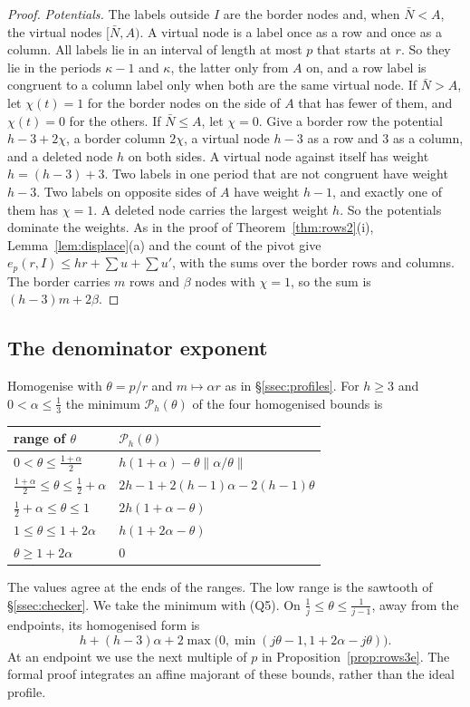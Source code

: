 \documentclass[11pt]{amsart}
\theoremstyle{definition}
\theoremstyle{remark}
\numberwithin{equation}{section}
\begin{document}
\begin{proof}
\emph{Potentials.} The labels outside $I$ are the border nodes and, when $\bar N<A$, the virtual nodes $[\bar N,A)$. A
virtual node is a label once as a row and once as a column. All labels lie in an interval of length at most $p$ that
starts at $r$. So they lie in the periods $\kappa-1$ and $\kappa$, the latter only from $A$ on, and a row label is
congruent to a column label only when both are the same virtual node. If $\bar N>A$, let $\chi(t)=1$ for the border
nodes on the side of $A$ that has fewer of them, and $\chi(t)=0$ for the others. If $\bar N\le A$, let $\chi=0$. Give a
border row the potential $h-3+2\chi$, a border column $2\chi$, a virtual node $h-3$ as a row and $3$ as a column, and a
deleted node $h$ on both sides. A virtual node against itself has weight $h=(h-3)+3$. Two labels in one period that are
not congruent have weight $h-3$. Two labels on opposite sides of $A$ have weight $h-1$, and exactly one of them has
$\chi=1$. A deleted node carries the largest weight $h$. So the potentials dominate the weights. As in the proof of
Theorem~\ref{thm:rows2}(i), Lemma~\ref{lem:displace}(a) and the count of the pivot give
$e_p(r,I)\le hr+\sum u+\sum u'$, with the sums over the border rows and columns. The border carries $m$ rows and
$\beta$ nodes with $\chi=1$, so the sum is $(h-3)m+2\beta$.
\end{proof}

\subsection{The denominator exponent}
Homogenise with $\theta=p/r$ and $m\mapsto\alpha r$ as in \S\ref{ssec:profiles}. For $h\ge3$ and $0<\alpha\le\frac13$ the minimum
$\mathcal P_h(\theta)$ of the four homogenised bounds is
\begin{center}
{\renewcommand{\arraystretch}{1.2}
\begin{tabular}{@{}ll@{}}
\toprule
range of $\theta$ & $\mathcal P_h(\theta)$\\
\midrule
$0<\theta\le\frac{1+\alpha}2$ & $h(1+\alpha)-\theta\|\alpha/\theta\|$\\
$\frac{1+\alpha}2\le\theta\le\frac12+\alpha$ & $2h-1+2(h-1)\alpha-2(h-1)\theta$\\
$\frac12+\alpha\le\theta\le1$ & $2h(1+\alpha-\theta)$\\
$1\le\theta\le1+2\alpha$ & $h(1+2\alpha-\theta)$\\
$\theta\ge1+2\alpha$ & $0$\\
\bottomrule
\end{tabular}}
\end{center}
The values agree at the ends of the ranges. The low range is the sawtooth of \S\ref{ssec:checker}.
We take the minimum with (Q5). On $\frac1j\le\theta\le\frac1{j-1}$, away from the endpoints, its homogenised form is
\[
 h+(h-3)\alpha+2\max\bigl(0,\min(j\theta-1,1+2\alpha-j\theta)\bigr).
\]
At an endpoint we use the next multiple of $p$ in Proposition~\ref{prop:rows3e}.
The formal proof integrates an affine majorant of these bounds, rather than the ideal profile.
\end{document}
